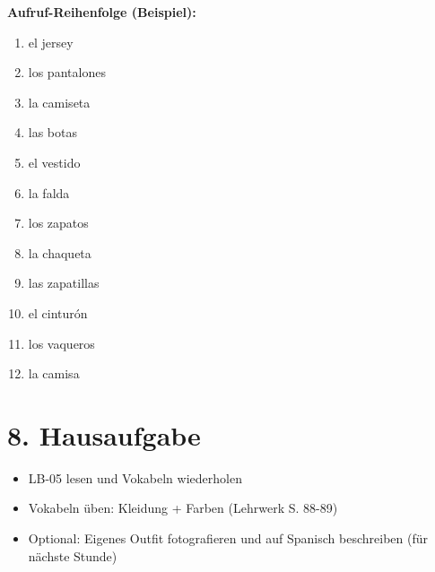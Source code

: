 \documentclass[11pt, a4paper]{article}
\begin{document}
\vspace{5pt}

\textbf{Aufruf-Reihenfolge (Beispiel):}
\begin{enumerate}[nosep]
    \item el jersey
    \item los pantalones
    \item la camiseta
    \item las botas
    \item el vestido
    \item la falda
    \item los zapatos
    \item la chaqueta
    \item las zapatillas
    \item el cinturón
    \item los vaqueros
    \item la camisa
\end{enumerate}


\section*{8. Hausaufgabe}

\begin{itemize}[nosep, leftmargin=*]
    \item LB-05 lesen und Vokabeln wiederholen
    \item Vokabeln üben: Kleidung + Farben (Lehrwerk S. 88-89)
    \item Optional: Eigenes Outfit fotografieren und auf Spanisch beschreiben (für nächste Stunde)
\end{itemize}
\end{document}
